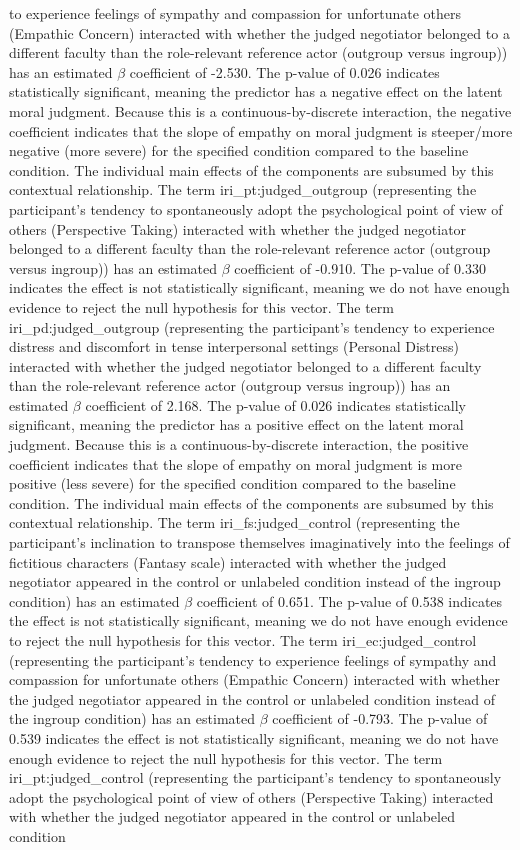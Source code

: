 \documentclass[11pt]{article}
\begin{document}
to experience feelings of sympathy and compassion for unfortunate others (Empathic Concern) interacted with whether the judged negotiator belonged to a different faculty than the role-relevant reference actor (outgroup versus ingroup)) has an estimated $\beta$ coefficient of -2.530. The p-value of 0.026 indicates statistically significant, meaning the predictor has a negative effect on the latent moral judgment. Because this is a continuous-by-discrete interaction, the negative coefficient indicates that the slope of empathy on moral judgment is steeper/more negative (more severe) for the specified condition compared to the baseline condition. The individual main effects of the components are subsumed by this contextual relationship. The term iri\_pt:judged\_outgroup (representing the participant's tendency to spontaneously adopt the psychological point of view of others (Perspective Taking) interacted with whether the judged negotiator belonged to a different faculty than the role-relevant reference actor (outgroup versus ingroup)) has an estimated $\beta$ coefficient of -0.910. The p-value of 0.330 indicates the effect is not statistically significant, meaning we do not have enough evidence to reject the null hypothesis for this vector. The term iri\_pd:judged\_outgroup (representing the participant's tendency to experience distress and discomfort in tense interpersonal settings (Personal Distress) interacted with whether the judged negotiator belonged to a different faculty than the role-relevant reference actor (outgroup versus ingroup)) has an estimated $\beta$ coefficient of 2.168. The p-value of 0.026 indicates statistically significant, meaning the predictor has a positive effect on the latent moral judgment. Because this is a continuous-by-discrete interaction, the positive coefficient indicates that the slope of empathy on moral judgment is more positive (less severe) for the specified condition compared to the baseline condition. The individual main effects of the components are subsumed by this contextual relationship. The term iri\_fs:judged\_control (representing the participant's inclination to transpose themselves imaginatively into the feelings of fictitious characters (Fantasy scale) interacted with whether the judged negotiator appeared in the control or unlabeled condition instead of the ingroup condition) has an estimated $\beta$ coefficient of 0.651. The p-value of 0.538 indicates the effect is not statistically significant, meaning we do not have enough evidence to reject the null hypothesis for this vector. The term iri\_ec:judged\_control (representing the participant's tendency to experience feelings of sympathy and compassion for unfortunate others (Empathic Concern) interacted with whether the judged negotiator appeared in the control or unlabeled condition instead of the ingroup condition) has an estimated $\beta$ coefficient of -0.793. The p-value of 0.539 indicates the effect is not statistically significant, meaning we do not have enough evidence to reject the null hypothesis for this vector. The term iri\_pt:judged\_control (representing the participant's tendency to spontaneously adopt the psychological point of view of others (Perspective Taking) interacted with whether the judged negotiator appeared in the control or unlabeled condition 
\end{document}
